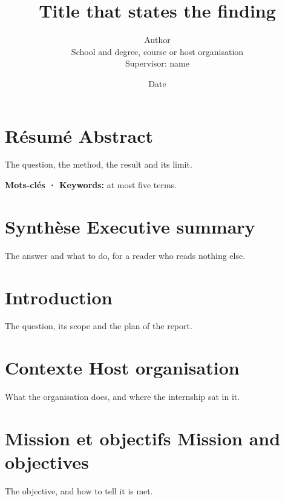 \documentclass[11pt,a4paper]{article}
\title{Title that states the finding}
\author{Author\\ \small School and degree, course or host organisation\\ \small Supervisor: name}
\date{Date}
\newcommand{\bi}[2]{#1 \textperiodcentered{} #2}
\begin{document}
\maketitle

\section*{\bi{Résumé}{Abstract}}
The question, the method, the result and its limit.

\noindent\textbf{Mots-clés · Keywords:} at most five terms.

\section*{\bi{Synthèse}{Executive summary}}
The answer and what to do, for a reader who reads nothing else.

\renewcommand{\contentsname}{\bi{Sommaire}{Contents}}
\tableofcontents

\section{Introduction}
The question, its scope and the plan of the report.

\section{\bi{Contexte}{Host organisation}}
What the organisation does, and where the internship sat in it.

\section{\bi{Mission et objectifs}{Mission and objectives}}
The objective, and how to tell it is met.

\end{document}
